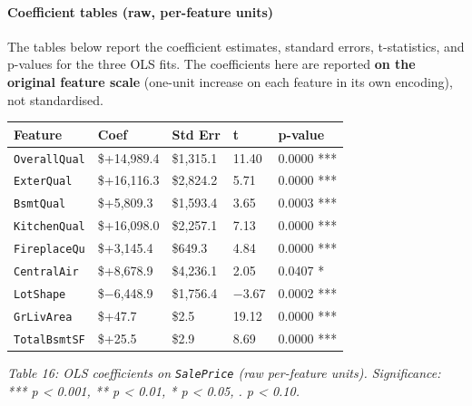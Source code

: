 \paragraph{Coefficient tables (raw, per-feature
units)}\label{coefficient-tables-raw-per-feature-units}

The tables below report the coefficient estimates, standard errors,
t-statistics, and p-values for the three OLS fits. The coefficients here
are reported \textbf{on the original feature scale} (one-unit increase
on each feature in its own encoding), not standardised.

\begin{longtable}[]{@{}lllll@{}}
\toprule\noalign{}
Feature & Coef & Std Err & t & p-value \\
\midrule\noalign{}
\endhead
\bottomrule\noalign{}
\endlastfoot
\texttt{OverallQual} & \$+14,989.4 & \$1,315.1 & 11.40 & 0.0000 *** \\
\texttt{ExterQual} & \$+16,116.3 & \$2,824.2 & 5.71 & 0.0000 *** \\
\texttt{BsmtQual} & \$+5,809.3 & \$1,593.4 & 3.65 & 0.0003 *** \\
\texttt{KitchenQual} & \$+16,098.0 & \$2,257.1 & 7.13 & 0.0000 *** \\
\texttt{FireplaceQu} & \$+3,145.4 & \$649.3 & 4.84 & 0.0000 *** \\
\texttt{CentralAir} & \$+8,678.9 & \$4,236.1 & 2.05 & 0.0407 * \\
\texttt{LotShape} & \$−6,448.9 & \$1,756.4 & −3.67 & 0.0002 *** \\
\texttt{GrLivArea} & \$+47.7 & \$2.5 & 19.12 & 0.0000 *** \\
\texttt{TotalBsmtSF} & \$+25.5 & \$2.9 & 8.69 & 0.0000 *** \\
\end{longtable}

\emph{Table 16: OLS coefficients on \texttt{SalePrice} (raw per-feature
units). Significance: *** p \textless{} 0.001, ** p \textless{} 0.01, *
p \textless{} 0.05, . p \textless{} 0.10.}

